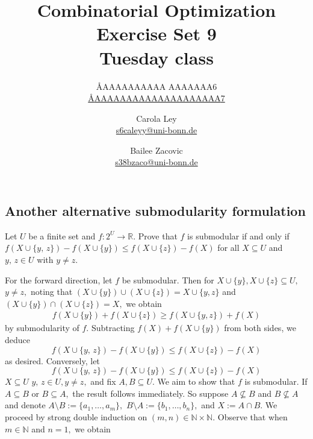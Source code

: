 \documentclass{article}
\title{Combinatorial Optimization \\ Exercise Set 9 \\ Tuesday class}
\author{
  \AA{AAAAAAAAAA AAAAAAA}{6} \\
  \href{mailto:\AA{AAAAAAAAAAAAAAAAAAAA}{7}}{\AA{AAAAAAAAAAAAAAAAAAAA}{7}}
  \and
  Carola Ley \\
  \href{mailto:s6caleyy@uni-bonn.de}{s6caleyy@uni-bonn.de}
  \and
  Bailee Zacovic \\
  \href{mailto:s38bzaco@uni-bonn.de}{s38bzaco@uni-bonn.de}
}
\newcommand{\N}{\mathbb{N}}
\newcommand{\R}{\mathbb{R}}
\begin{document}
  \maketitle

  \setcounter{section}{9}
  \subsection{Another alternative submodularity formulation}
  \begin{centerframebox}
    Let $U$ be a finite set and $f : 2^U \to \R$. Prove that $f$ is submodular
    if and only if $f(X \cup \{y,\, z\}) - f(X \cup \{y\}) \leq f(X \cup \{z\}) - f(X)$ for all $X \subseteq U$ and
    $y,\, z \in U$ with $y \neq z$.
  \end{centerframebox}
  For the forward direction, let $f$ be submodular. Then for $X\cup \{y\},X\cup \{z\}\subseteq U,$ $y\neq z,$ noting that $(X\cup \{y\})\cup (X\cup \{z\})=X\cup \{y,z\}$ and $(X\cup \{y\})\cap (X\cup \{z\})=X,$ we obtain
  \begin{align*}
      f(X\cup \{y\})+f(X\cup \{z\})\geq f(X\cup \{y,z\})+f(X)
  \end{align*}
  by submodularity of $f$. Subtracting $f(X)+f(X\cup \{y\})$ from both sides, we deduce
  $$f(X \cup \{y,\, z\}) - f(X \cup \{y\}) \leq f(X \cup \{z\}) - f(X)$$as desired. Conversely, let
  \begin{equation}f(X \cup \{y,\, z\}) - f(X \cup \{y\}) \leq f(X \cup \{z\}) - f(X)\end{equation} $X \subseteq U$     $y,\, z \in U, y \neq z,$ and fix $A,B\subseteq U$. We aim to show that $f$ is submodular. If $A\subseteq B$ or $B\subseteq A,$ the result follows immediately. So suppose $A \not\subseteq B$ and $ B \not\subseteq A$ and denote $A\setminus B:=\{a_1,\dots,a_m\},$ $B\setminus A:=\{b_1,\dots,b_n\},$ and $X:=A\cap B.$ We proceed by strong double induction on $(m,n)\in \mathbb{N}\times \N.$ Observe that when $m\in \mathbb{N}$ and $n=1,$ we obtain
\end{document}
